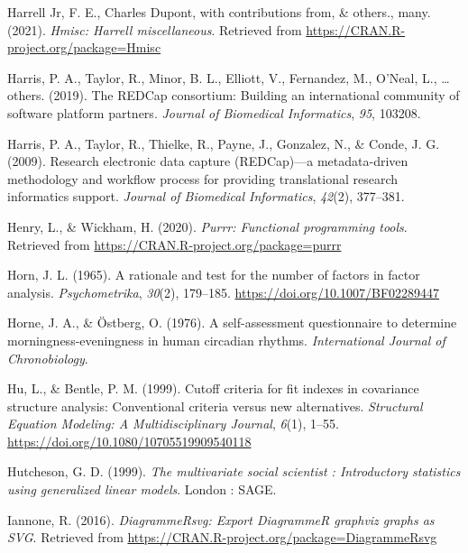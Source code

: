 \documentclass[
  english,
  man]{apa6}
\newlength{\cslhangindent}
\newlength{\cslentryspacingunit} %
\newenvironment{CSLReferences}[2] %
 {%
  \setlength{\parindent}{0pt}
  \ifodd #1
  \let\oldpar\par
  \def\par{\hangindent=\cslhangindent\oldpar}
  \fi
  \setlength{\parskip}{#2\cslentryspacingunit}
 }%
 {}
\begin{document}
\begin{CSLReferences}{1}{0}
\leavevmode{}%
Harrell Jr, F. E., Charles Dupont, with contributions from, \& others., many. (2021). \emph{Hmisc: Harrell miscellaneous}. Retrieved from \url{https://CRAN.R-project.org/package=Hmisc}

\leavevmode{}%
Harris, P. A., Taylor, R., Minor, B. L., Elliott, V., Fernandez, M., O'Neal, L., \ldots{} others. (2019). The REDCap consortium: Building an international community of software platform partners. \emph{Journal of Biomedical Informatics}, \emph{95}, 103208.

\leavevmode{}%
Harris, P. A., Taylor, R., Thielke, R., Payne, J., Gonzalez, N., \& Conde, J. G. (2009). Research electronic data capture (REDCap)---a metadata-driven methodology and workflow process for providing translational research informatics support. \emph{Journal of Biomedical Informatics}, \emph{42}(2), 377--381.

\leavevmode{}%
Henry, L., \& Wickham, H. (2020). \emph{Purrr: Functional programming tools}. Retrieved from \url{https://CRAN.R-project.org/package=purrr}

\leavevmode{}%
Horn, J. L. (1965). A rationale and test for the number of factors in factor analysis. \emph{Psychometrika}, \emph{30}(2), 179--185. \url{https://doi.org/10.1007/BF02289447}

\leavevmode{}%
Horne, J. A., \& Östberg, O. (1976). A self-assessment questionnaire to determine morningness-eveningness in human circadian rhythms. \emph{International Journal of Chronobiology}.

\leavevmode{}%
Hu, L., \& Bentle, P. M. (1999). Cutoff criteria for fit indexes in covariance structure analysis: {Conventional} criteria versus new alternatives. \emph{Structural Equation Modeling: A Multidisciplinary Journal}, \emph{6}(1), 1--55. \url{https://doi.org/10.1080/10705519909540118}

\leavevmode{}%
Hutcheson, G. D. (1999). \emph{The multivariate social scientist : Introductory statistics using generalized linear models}. {London : SAGE}.

\leavevmode{}%
Iannone, R. (2016). \emph{DiagrammeRsvg: Export DiagrammeR graphviz graphs as SVG}. Retrieved from \url{https://CRAN.R-project.org/package=DiagrammeRsvg}


\end{CSLReferences}
\end{document}
